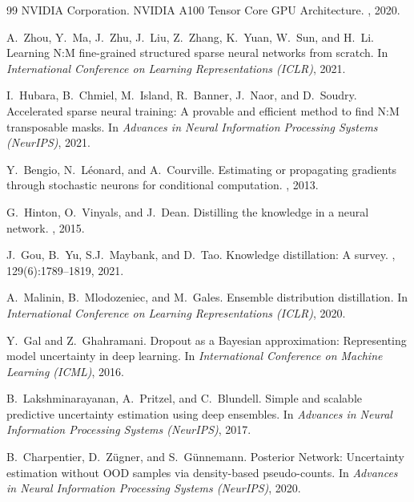 \documentclass[11pt, a4paper]{article}
\begin{document}
\begin{thebibliography}{99}
NVIDIA Corporation.
\newblock NVIDIA A100 Tensor Core GPU Architecture.
, 2020.

A.~Zhou, Y.~Ma, J.~Zhu, J.~Liu, Z.~Zhang, K.~Yuan, W.~Sun, and H.~Li.
\newblock Learning N:M fine-grained structured sparse neural networks from scratch.
\newblock In {\em International Conference on Learning Representations (ICLR)}, 2021.

I.~Hubara, B.~Chmiel, M.~Island, R.~Banner, J.~Naor, and D.~Soudry.
\newblock Accelerated sparse neural training: A provable and efficient method to find N:M transposable masks.
\newblock In {\em Advances in Neural Information Processing Systems (NeurIPS)}, 2021.


Y.~Bengio, N.~L{\'e}onard, and A.~Courville.
\newblock Estimating or propagating gradients through stochastic neurons for conditional computation.
, 2013.


G.~Hinton, O.~Vinyals, and J.~Dean.
\newblock Distilling the knowledge in a neural network.
, 2015.

J.~Gou, B.~Yu, S.J.~Maybank, and D.~Tao.
\newblock Knowledge distillation: A survey.
, 129(6):1789--1819, 2021.

A.~Malinin, B.~Mlodozeniec, and M.~Gales.
\newblock Ensemble distribution distillation.
\newblock In {\em International Conference on Learning Representations (ICLR)}, 2020.


Y.~Gal and Z.~Ghahramani.
\newblock Dropout as a Bayesian approximation: Representing model uncertainty in deep learning.
\newblock In {\em International Conference on Machine Learning (ICML)}, 2016.

B.~Lakshminarayanan, A.~Pritzel, and C.~Blundell.
\newblock Simple and scalable predictive uncertainty estimation using deep ensembles.
\newblock In {\em Advances in Neural Information Processing Systems (NeurIPS)}, 2017.

B.~Charpentier, D.~Z{\"u}gner, and S.~G{\"u}nnemann.
\newblock Posterior Network: Uncertainty estimation without OOD samples via density-based pseudo-counts.
\newblock In {\em Advances in Neural Information Processing Systems (NeurIPS)}, 2020.


\end{thebibliography}
\end{document}
